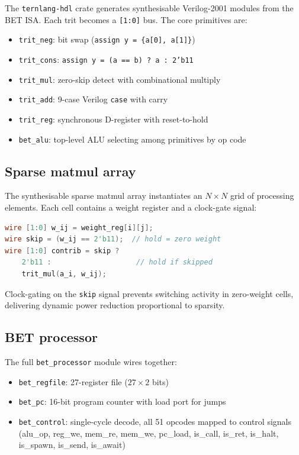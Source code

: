 \documentclass[journal,10pt,twocolumn]{IEEEtran}
\begin{document}
The \texttt{ternlang-hdl} crate generates synthesisable Verilog-2001 modules
from the BET ISA. Each trit becomes a \texttt{[1:0]} bus. The core primitives
are:

\begin{itemize}
  \item \texttt{trit\_neg}: bit swap (\texttt{assign y = \{a[0], a[1]\}})
  \item \texttt{trit\_cons}: \texttt{assign y = (a == b) ? a : 2'b11}
  \item \texttt{trit\_mul}: zero-skip detect with combinational multiply
  \item \texttt{trit\_add}: 9-case Verilog \texttt{case} with carry
  \item \texttt{trit\_reg}: synchronous D-register with reset-to-hold
  \item \texttt{bet\_alu}: top-level ALU selecting among primitives by op code
\end{itemize}

\subsection{Sparse matmul array}

The synthesisable sparse matmul array instantiates an $N \times N$ grid of
processing elements. Each cell contains a weight register and a clock-gate
signal:

\begin{lstlisting}[language=Verilog,
  caption={Per-cell clock gating in sparse matmul}]
wire [1:0] w_ij = weight_reg[i][j];
wire skip = (w_ij == 2'b11);  // hold = zero weight
wire [1:0] contrib = skip ?
    2'b11 :                    // hold if skipped
    trit_mul(a_i, w_ij);
\end{lstlisting}

Clock-gating on the \texttt{skip} signal prevents switching activity in
zero-weight cells, delivering dynamic power reduction proportional to sparsity.

\subsection{BET processor}

The full \texttt{bet\_processor} module wires together:
\begin{itemize}
  \item \texttt{bet\_regfile}: 27-register file ($27 \times 2$ bits)
  \item \texttt{bet\_pc}: 16-bit program counter with load port for jumps
  \item \texttt{bet\_control}: single-cycle decode, all 51 opcodes mapped to
        control signals (alu\_op, reg\_we, mem\_re, mem\_we, pc\_load,
        is\_call, is\_ret, is\_halt, is\_spawn, is\_send, is\_await)
\end{itemize}
\end{document}
